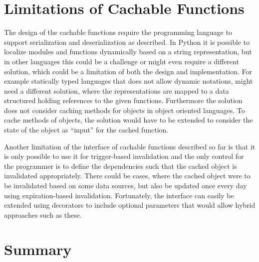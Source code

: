 

\section{Limitations of Cachable Functions}
\label{sec:cachable-function-discussion}

The design of the cachable functions require the programming language to support serialization and deserialization as described. In Python it is possible to localize modules and functions dynamically based on a string representation, but in other languages this could be a challenge or might even require a different solution, which could be a limitation of both the design and implementation. For example statically typed languages that does not allow dynamic notations, might need a different solution, where the representations are mapped to a data structured holding references to the given functions. Furthermore the solution does not consider caching methods for objects in object oriented languages. To cache methods of objects, the solution would have to be extended to consider the state of the object as ``input'' for the cached function.

Another limitation of the interface of cachable functions described so far is that it is only possible to use it for trigger-based invalidation and the only control for the programmer is to define the dependencies such that the cached object is invalidated appropriately. There could be cases, where the cached object were to be invalidated based on some data sources, but also be updated once every day using expiration-based invalidation. Fortunately, the interface can easily be extended using decorators to include optional parameters that would allow hybrid approaches such as these.


\section{Summary}
\label{sec:cachable-functions-summary}

